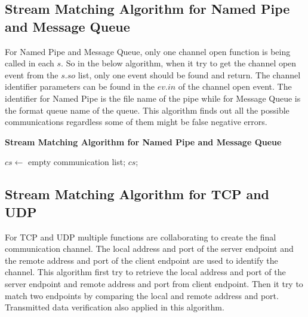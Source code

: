 \subsection{Stream Matching Algorithm for Named Pipe and Message Queue}
For Named Pipe and Message Queue, only one channel open function is being called in each $s$. So in the below algorithm, when it try to get the channel open event from the $s.so$ list, only one event should be found and return. The channel identifier parameters can be found in the $ev.in$ of the channel open event. The identifier for Named Pipe is the file name of the pipe while for Message Queue is the format queue name of the queue. This algorithm finds out all the possible communications regardless some of them might be false negative errors. 

\begin{algorithm}[H]
\DontPrintSemicolon
\caption{{\bf Stream Matching Algorithm for Named Pipe and Message Queue} \label{channelAlg1}}
$cs \leftarrow$ empty communication list;\;
\KwRet $cs$;\;
\end{algorithm} 


\subsection{Stream Matching Algorithm for TCP and UDP}
For TCP and UDP multiple functions are collaborating to create the final communication channel. The local address and port of the server endpoint and the remote address and port of the client endpoint are used to identify the channel. This algorithm first try to retrieve the local address and port of the server endpoint and remote address and port from client endpoint. Then it try to match two endpoints by comparing the local and remote address and port. Transmitted data verification also applied in this algorithm.

